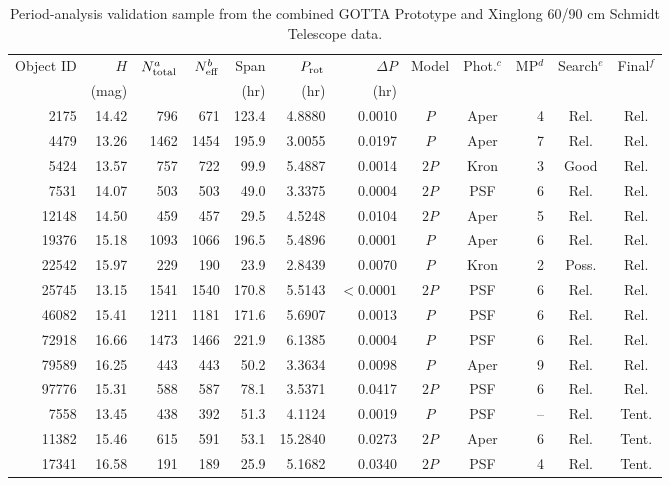 \begin{table}[!htbp]
\centering
\caption{Period-analysis validation sample from the combined GOTTA Prototype and Xinglong 60/90 cm Schmidt Telescope data.}
\label{tab:period_validation}
\footnotesize
\setlength{\tabcolsep}{4.5pt}
\renewcommand{\arraystretch}{1.12}
\begin{threeparttable}
\begin{tabular}{rrrrrrrccrcc}
\toprule
Object ID & $H$ & $N_{\rm total}^{a}$ & $N_{\rm eff}^{b}$ & Span & $P_{\rm rot}$ & $\Delta P$ & Model & Phot.$^{c}$ & MP$^{d}$ & Search$^{e}$ & Final$^{f}$ \\
          & (mag) & & & (hr) & (hr) & (hr) & & & & & \\
\midrule
2175 & 14.42 & 796 & 671 & 123.4 & 4.8880 & 0.0010 & $P$ & Aper & 4 & Rel. & Rel. \\
4479 & 13.26 & 1462 & 1454 & 195.9 & 3.0055 & 0.0197 & $P$ & Aper & 7 & Rel. & Rel. \\
5424 & 13.57 & 757 & 722 & 99.9 & 5.4887 & 0.0014 & $2P$ & Kron & 3 & Good & Rel. \\
7531 & 14.07 & 503 & 503 & 49.0 & 3.3375 & 0.0004 & $2P$ & PSF & 6 & Rel. & Rel. \\
12148 & 14.50 & 459 & 457 & 29.5 & 4.5248 & 0.0104 & $2P$ & Aper & 5 & Rel. & Rel. \\
19376 & 15.18 & 1093 & 1066 & 196.5 & 5.4896 & 0.0001 & $P$ & Aper & 6 & Rel. & Rel. \\
22542 & 15.97 & 229 & 190 & 23.9 & 2.8439 & 0.0070 & $P$ & Kron & 2 & Poss. & Rel. \\
25745 & 13.15 & 1541 & 1540 & 170.8 & 5.5143 & $<0.0001$ & $2P$ & PSF & 6 & Rel. & Rel. \\
46082 & 15.41 & 1211 & 1181 & 171.6 & 5.6907 & 0.0013 & $P$ & PSF & 6 & Rel. & Rel. \\
72918 & 16.66 & 1473 & 1466 & 221.9 & 6.1385 & 0.0004 & $P$ & PSF & 6 & Rel. & Rel. \\
79589 & 16.25 & 443 & 443 & 50.2 & 3.3634 & 0.0098 & $P$ & Aper & 9 & Rel. & Rel. \\
97776 & 15.31 & 588 & 587 & 78.1 & 3.5371 & 0.0417 & $2P$ & PSF & 6 & Rel. & Rel. \\
7558 & 13.45 & 438 & 392 & 51.3 & 4.1124 & 0.0019 & $P$ & PSF & -- & Rel. & Tent. \\
11382 & 15.46 & 615 & 591 & 53.1 & 15.2840 & 0.0273 & $2P$ & Aper & 6 & Rel. & Tent. \\
17341 & 16.58 & 191 & 189 & 25.9 & 5.1682 & 0.0340 & $2P$ & PSF & 4 & Rel. & Tent. \\

\end{tabular}
\end{threeparttable}
\end{table}
